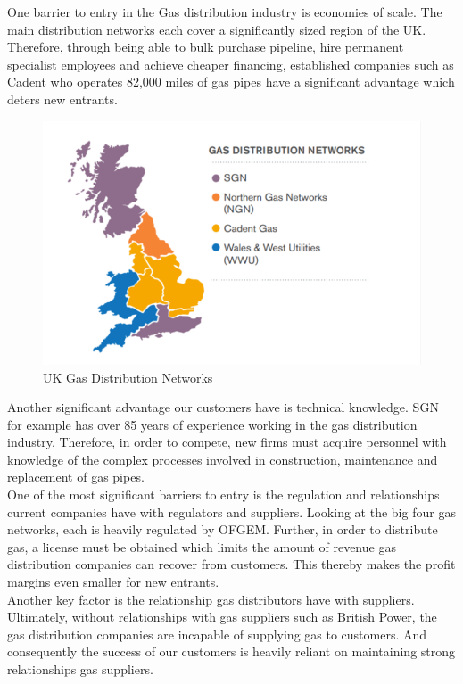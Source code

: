 \documentclass[11pt]{article}		%
\begin{document}
				One barrier to entry in the Gas distribution industry is economies of scale. The main distribution networks each cover a significantly sized region of the UK. Therefore, through being able to bulk purchase pipeline, hire permanent specialist employees and achieve cheaper financing, established companies such as Cadent who operates 82,000 miles of gas pipes have a significant advantage which deters new entrants. \\
					\begin{figure}[h]
			    \centering
		    	\includegraphics[scale=0.8]{distribution.pdf}
			    \caption{UK Gas Distribution Networks} %
		    	\label{distrit}
	        	\end{figure}
				
				Another significant advantage our customers have is technical knowledge. SGN for example has over 85 years of experience working in the gas distribution industry. Therefore, in order to compete, new firms must acquire personnel with knowledge of the complex processes involved in construction, maintenance and replacement of gas pipes. \\
				One of the most significant barriers to entry is the regulation and relationships current companies have with regulators and suppliers. Looking at the big four gas networks, each is heavily regulated by OFGEM. Further, in order to distribute gas, a license must be obtained which limits the amount of revenue gas distribution companies can recover from customers. This thereby makes the profit margins even smaller for new entrants. \\
	            \hspace*{3ex}Another key factor is the relationship gas distributors have with suppliers. Ultimately, without relationships with gas suppliers such as British Power, the gas distribution companies are incapable of supplying gas to customers. And consequently the success of our customers is heavily reliant on maintaining strong relationships gas suppliers.
\end{document}
